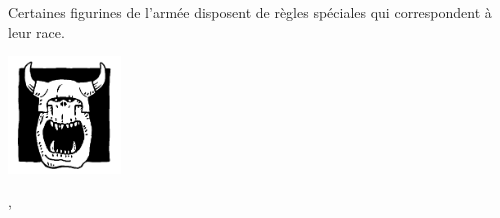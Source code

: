 

\startarmyspecialrules

\armyspecialruleentry{\greenhideraces}

Certaines figurines de l'armée disposent de règles spéciales qui correspondent à leur race.

\newcommand{\logosize}{3cm}
\begin{multicols}{3}\raggedcolumns

\begin{center}
\includegraphics[width=\logosize]{pics/commonorc.png}
\vspace*{-1cm}\subsubtitle{\commonorc}

\vspace*{5pt}\unruly{}, \borntofight{}
\end{center}

\columnbreak


\end{multicols}
